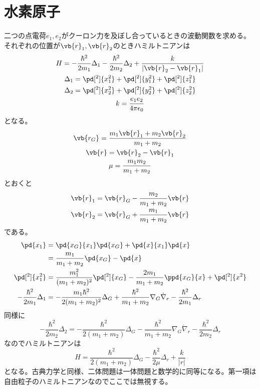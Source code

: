 \section{水素原子}
	二つの点電荷$e_1, e_2$がクーロン力を及ぼし合っているときの波動関数を求める。それぞれの位置が$\vb{r}_1, \vb{r}_2$のときハミルトニアンは
	\begin{gather*}
		H = -\frac{\hbar^2}{2m_1}\Delta_1 -\frac{\hbar^2}{2m_2}\Delta_2 + \frac{k}{|\vb{r}_2 - \vb{r}_1|}\\
		\Delta_1 = \pd[^2]{x_1^2} + \pd[^2]{y_1^2} + \pd[^2]{z_1^2}\\
		\Delta_2 = \pd[^2]{x_2^2} + \pd[^2]{y_2^2} + \pd[^2]{z_2^2}\\
		k = \frac{e_1e_2}{4\pi\epsilon_0}
	\end{gather*}
	となる。
	\begin{gather*}
		\vb{r_G} = \frac{m_1\vb{r}_1 + m_2\vb{r}_2}{m_1 + m_2}\\
		\vb{r} = \vb{r}_2 - \vb{r}_1\\
		\mu = \frac{m_1m_2}{m_1 + m_2}
	\end{gather*}
	とおくと
	\begin{gather*}
		\vb{r}_1 = \vb{r}_G - \frac{m_2}{m_1 + m_2}\vb{r}\\
		\vb{r}_2 = \vb{r}_G + \frac{m_1}{m_1 + m_2}\vb{r}\\
	\end{gather*}
	である。
	\begin{align*}
		\pd{x_1}
		&= \pd{x_G}{x_1}\pd{x_G} + \pd{x}{x_1}\pd{x}\\
		&= \frac{m_1}{m_1 + m_2}\pd{x_G} - \pd{x}\\
		\pd[^2]{x_1^2}
		&= \frac{m_1^2}{(m_1 + m_2)^2}\pd[^2]{x_G} - \frac{2m_1}{m_1 + m_2}\ppd{x_G}{x} + \pd[^2]{x^2}\\
		-\frac{\hbar^2}{2m_1}\Delta_1
		&= -\frac{m_1\hbar^2}{2(m_1 + m_2)^2}\Delta_G + \frac{\hbar^2}{m_1 + m_2}\nabla_G\dot\nabla_r - \frac{\hbar^2}{2m_1}\Delta_r\\
	\end{align*}
	同様に
		\[-\frac{\hbar^2}{2m_2}\Delta_2 = -\frac{\hbar^2}{2(m_1 + m_2)}\Delta_G - \frac{\hbar^2}{m_1 + m_2}\nabla_G\dot\nabla_r -\frac{\hbar^2}{2m_2}\Delta_r\]
	なのでハミルトニアンは
		\[H = \frac{\hbar^2}{2(m_1 + m_2)}\Delta_G - \frac{\hbar^2}{2\mu}\Delta_r + \frac{k}{|r|}\]
	となる。古典力学と同様、二体問題は一体問題と数学的に同等になる。第一項は自由粒子のハミルトニアンなのでここでは無視する。

